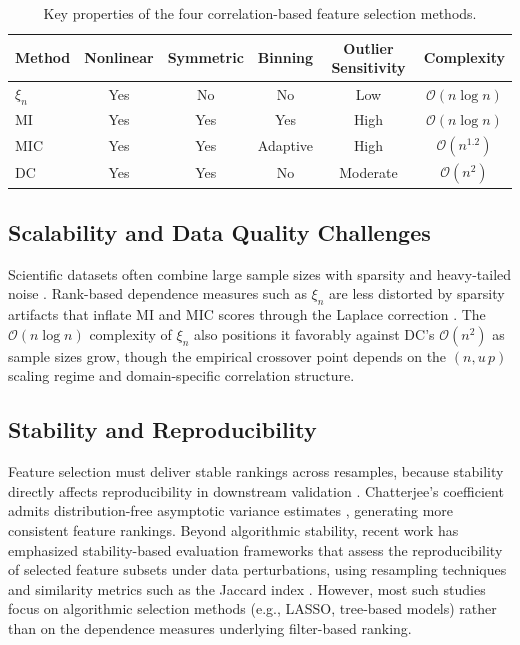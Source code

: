 \documentclass[twoside,11pt]{article}
\begin{document}
\begin{table}[t]
\centering
\caption{Key properties of the four correlation-based feature selection methods.}
\label{tab:char}
\begin{tabular}{lccccc}
\toprule
Method & Nonlinear & Symmetric & Binning & Outlier Sensitivity & Complexity \\
\midrule
$\xi_n$ & Yes & No  & No       & Low      & $\mathcal{O}(n \log n)$ \\
MI      & Yes & Yes & Yes      & High     & $\mathcal{O}(n \log n)$ \\
MIC     & Yes & Yes & Adaptive & High     & $\mathcal{O}(n^{1.2})$  \\
DC      & Yes & Yes & No       & Moderate & $\mathcal{O}(n^{2})$    \\
\bottomrule
\end{tabular}
\end{table}

\subsection{Scalability and Data Quality Challenges}
\label{sec:scalability}
Scientific datasets often combine large sample sizes with sparsity and
heavy-tailed noise \citep{Matasov2020vis}. Rank-based dependence measures such
as $\xi_n$ are less distorted by sparsity artifacts that inflate MI and MIC
scores through the Laplace correction \citep{Fernandes2010, Frenay2013,
Cao2021}. The $\mathcal{O}(n \log n)$ complexity of $\xi_n$ also positions it
favorably against DC's $\mathcal{O}(n^2)$ as sample sizes grow, though the
empirical crossover point depends on the $(n,u\, p)$ scaling regime and
domain-specific correlation structure.

\subsection{Stability and Reproducibility}
\label{sec:stability}
Feature selection must deliver stable rankings across resamples, because
stability directly affects reproducibility in downstream validation
\citep{Buyukkececi2023review}. Chatterjee's coefficient admits
distribution-free asymptotic variance estimates \citep{Shi2022biometrika},
generating more consistent feature rankings. Beyond algorithmic stability,
recent work has emphasized stability-based evaluation frameworks that assess the
reproducibility of selected feature subsets under data perturbations, using
resampling techniques and similarity metrics such as the Jaccard index
\citep{Nogueira2016jaccard}. However, most such studies focus on algorithmic
selection methods (e.g., LASSO, tree-based models) rather than on the
dependence measures underlying filter-based ranking.
\end{document}

